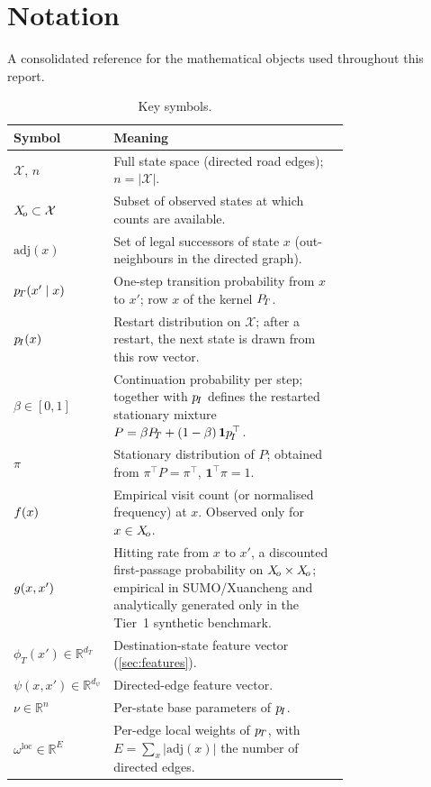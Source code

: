 \section{Notation}\label{sec:notation}

A consolidated reference for the mathematical objects used throughout this
report.

\begin{table}[H]
\centering
\caption{Key symbols.}
\label{tab:notation}
\small
\begin{tabular}{@{}lp{0.74\linewidth}@{}}
\toprule
\textbf{Symbol} & \textbf{Meaning} \\
\midrule
$\mathcal{X}$, $n$ & Full state space (directed road edges); $n = |\mathcal{X}|$. \\
$X_{\!o} \subset \mathcal{X}$ & Subset of observed states at which counts are available. \\
$\mathrm{adj}(x)$ & Set of legal successors of state $x$ (out-neighbours in the directed graph). \\
$p_{\!T}(x'\mid x)$ & One-step transition probability from $x$ to $x'$; row $x$ of the kernel $P_{\!T}$. \\
$p_{\!I}(x)$ & Restart distribution on $\mathcal{X}$; after a restart, the next state is drawn from this row vector. \\
$\beta \in [0,1]$ & Continuation probability per step; together with $p_{\!I}$ defines the restarted stationary mixture $P = \beta P_{\!T} + (1-\beta)\,\bm{1}p_{\!I}^\top$. \\
$\pi$ & Stationary distribution of $P$; obtained from $\pi^\top P = \pi^\top$, $\bm{1}^\top\pi = 1$. \\
$f(x)$ & Empirical visit count (or normalised frequency) at $x$. Observed only for $x \in X_{\!o}$. \\
$g(x, x')$ & Hitting rate from $x$ to $x'$, a discounted first-passage probability on $X_{\!o} \times X_{\!o}$; empirical in SUMO/Xuancheng and analytically generated only in the Tier~1 synthetic benchmark. \\
$\phi_T(x') \in \mathbb{R}^{d_T}$ & Destination-state feature vector (\cref{sec:features}). \\
$\psi(x, x') \in \mathbb{R}^{d_\psi}$ & Directed-edge feature vector. \\
$\nu \in \mathbb{R}^n$ & Per-state base parameters of $p_{\!I}$. \\
$\omega^{\mathrm{loc}} \in \mathbb{R}^E$ & Per-edge local weights of $p_{\!T}$, with $E = \sum_x |\mathrm{adj}(x)|$ the number of directed edges. \\

\end{tabular}
\end{table}
